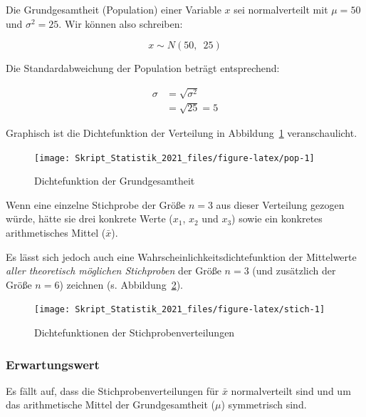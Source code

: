 \documentclass[
  11pt,
  ngerman,
  a4paper,
]{report}
\begin{document}
Die Grundgesamtheit (Population) einer Variable \(x\) sei normalverteilt mit \(\mu=50\) und \(\sigma^2=25\). Wir können also schreiben:

\nopagebreak

\[ x \sim N(50, \enspace 25) \]

Die Standardabweichung der Population beträgt entsprechend:

\nopagebreak

\[\begin{aligned}
\sigma&=\sqrt{\sigma^2}\\[4pt]
&=\sqrt{25}=5\end{aligned}\]

Graphisch ist die Dichtefunktion der Verteilung in Abbildung~\ref{fig:pop} veranschaulicht.

\begin{figure}[!h]

{\centering \texttt{[image: Skript\_Statistik\_2021\_files/figure-latex/pop-1]} 

}

\caption{Dichtefunktion der Grundgesamtheit}\label{fig:pop}
\end{figure}

Wenn eine einzelne Stichprobe der Größe \(n=3\) aus dieser Verteilung gezogen würde, hätte sie drei konkrete Werte (\(x_1\), \(x_2\) und \(x_3\)) sowie ein konkretes arithmetisches Mittel (\(\bar{x}\)).

Es lässt sich jedoch auch eine Wahrscheinlichkeitsdichtefunktion der Mittelwerte \emph{aller theoretisch möglichen Stichproben} der Größe \(n=3\) (und zusätzlich der Größe \(n=6\)) zeichnen (s. Abbildung~\ref{fig:stich}).

\begin{figure}[!h]

{\centering \texttt{[image: Skript\_Statistik\_2021\_files/figure-latex/stich-1]} 

}

\caption{Dichtefunktionen der Stichprobenverteilungen}\label{fig:stich}
\end{figure}

\hypertarget{erwartungswert}{%
\subsubsection{Erwartungswert}\label{erwartungswert}}

Es fällt auf, dass die Stichprobenverteilungen für \(\bar{x}\) normalverteilt sind und um das arithmetische Mittel der Grundgesamtheit (\(\mu\)) symmetrisch sind.
\end{document}

